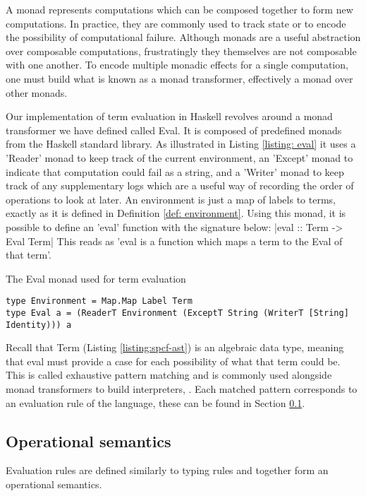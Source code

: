 \documentclass[12pt,a4paper]{report}
\theoremstyle{definition}
\theoremstyle{remark}
\begin{document}
A monad represents computations which can be composed together to form new computations. In practice, they are commonly used to track state or to encode the possibility of computational failure. Although monads are a useful abstraction over composable computations, frustratingly they themselves are not composable with one another. To encode multiple monadic effects for a single computation, one must build what is known as a monad transformer, effectively a monad over other monads.

Our implementation of term evaluation in Haskell revolves around a monad transformer we have defined called Eval. It is composed of predefined monads from the Haskell standard library. As illustrated in Listing \ref{listing: eval} it uses a 'Reader' monad to keep track of the current environment, an 'Except' monad to indicate that computation could fail as a string, and a 'Writer' monad to keep track of any supplementary logs which are a useful way of recording the order of operations to look at later. An environment is just a map of labels to terms, exactly as it is defined in Definition \ref{def: environment}. Using this monad, it is possible to define an 'eval' function with the signature below:
|eval :: Term -> Eval Term|
This reads as 'eval is a function which maps a term to the Eval of that term'. 

\begin{listing}[!ht]
\caption{The Eval monad used for term evaluation}
\begin{verbatim}
type Environment = Map.Map Label Term
type Eval a = (ReaderT Environment (ExceptT String (WriterT [String] Identity))) a
\end{verbatim}
\label{listing: eval}
\end{listing}

Recall that Term (Listing \ref{listing:spcf-ast}) is an algebraic data type, meaning that eval must provide a case for each possibility of what that term could be. This is called exhaustive pattern matching and is commonly used alongside monad transformers to build interpreters, \citep[\emph{e.g.},][]{Liang1995MonadTA}. Each matched pattern corresponds to an evaluation rule of the language, these can be found in Section \ref{section: op sem}.

\subsection{Operational semantics}\label{section: op sem}
Evaluation rules are defined similarly to typing rules and together form an operational semantics.
\end{document}
